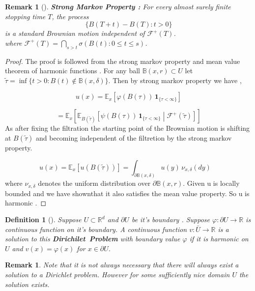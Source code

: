 \documentclass{article}
\numberwithin{equation}{section}
\newtheorem{remark}[theorem]{Remark}
\newtheorem{definition}[theorem]{Definition}
\begin{document}
\begin{remark}[{\cite[Theorem 2.16]{PeresMortersBook}}]
\textbf{Strong Markov Property :} 
For every almost surely finite stopping time \( T \),  
the process  
\[
\{ B(T + t) - B(T) : t > 0 \}
\]  
is a standard Brownian motion independent of \( \mathcal{F}^{+}(T) \).\\
where \( \mathcal{F}^{+}(T) = \bigcap_{s > t} \sigma(B(t) : 0 \leq t \leq s)\).

\end{remark}
\begin{proof}
The proof is followed from the strong markov property and mean value theorem of harmonic functions . For any ball \(\mathbb{B}(x,r) \subset U\) let \(
\tilde{\tau} = \inf\{t > 0 : B(t) \notin \mathbb{B}(x, \delta)\}
\). Then by strong markov property we have ,

\[
u(x) = \mathbb{E}_x \left[ \varphi(B(\tau)) \, \mathbf{1}_{\{\tau < \infty\}} \right]
\]

\[
= \mathbb{E}_x \left[ \mathbb{E}_{B(\tilde{\tau})} \left[ \psi(B(\tau)) \, \mathbf{1}_{\{\tau < \infty\}} \middle| \mathcal{F}^+(\tilde{\tau}) \right] \right]
\]
As after fixing the filtration the starting point of the Brownian motion is shifting at \(B(\tilde{\tau})\) and becoming independent of the filtretion by the strong markov property.

\[ u(x)
= \mathbb{E}_x \left[ u(B(\tilde{\tau})) \right]
= \int_{\partial \mathbb{B}(x,\delta)} u(y) \, \nu_{x,\delta}(dy) \quad 
\]
where \(\nu_{x,\delta}\) denotes the uniform distribution over \(\partial{\mathbb{B}(x,r)}\). Given u is locally bounded and we have shownthat it also satisfies the mean value property. So u is harmonic .



\end{proof}
\begin{definition}[{\cite[Definitio 3.9]{PeresMortersBook}}]
Suppose \(U \subset \mathbb{R}^d \) and \(\partial{U}\) be it's boundary . Suppose \(\varphi : \partial{U} \to \mathbb{R}\) is continuous function on it's boundary. A continuous function \(v : \bar{U} \to \mathbb{R}\) is a solution to this \textbf{Dirichilet\ Problem } with boundary value \(\varphi\) if it is harmonic on \(U\) and \(v(x)=\varphi(x)\) for \(x \in \partial{U}\).
\end{definition}
\begin{remark}
Note that it is not always necessary that there will always exist a solution to a Dirichlet problem. However for some sufficiently nice domain \(U\) the solution exists.
\end{remark}
\end{document}
